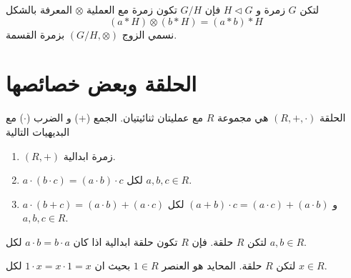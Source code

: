 \begin{definition}
	لتكن $G$ زمرة و $H \triangleleft G$ فإن $G/H$ تكون زمرة مع العملية $\otimes$ المعرفة بالشكل
	\[
	(a*H)\otimes(b*H) = (a*b)*H
	\]
	نسمي الزوج $(G/H, \otimes)$ بزمرة القسمة.
\end{definition}

\section{الحلقة وبعض خصائصها}

\begin{definition}
	الحلقة $(R, +, \cdot)$ هي مجموعة $R$ مع عمليتان ثنائيتيان. الجمع (+) و الضرب ($\cdot$) مع البديهيات التالية
	\begin{enumerate}
		\item $(R, +)$ زمرة ابدالية.
		\item $a\cdot(b\cdot c) = (a\cdot b)\cdot c$ لكل $a, b, c\in R$.
		\item $a\cdot(b+c) = (a\cdot b) + (a\cdot c)$ و $(a+b)\cdot c = (a\cdot c) + (a\cdot b)$ لكل $a, b, c\in R$. 
	\end{enumerate}
\end{definition}

\begin{definition}
	لتكن $R$ حلقة. فإن $R$ تكون حلقة ابدالية اذا كان $a\cdot b = b\cdot a$ لكل $a, b\in R$.
\end{definition} 

\begin{definition}
	لتكن $R$ حلقة. المحايد هو العنصر $1\in R$ بحيث ان $1\cdot x= x\cdot1=x$ لكل $x\in R$.
\end{definition}

